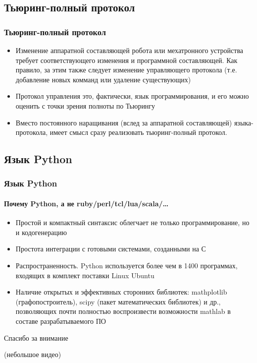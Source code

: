 \documentclass{beamer}
\begin{document}
\subsection{Тьюринг-полный протокол}
\begin{frame}
\frametitle{Тьюринг-полный протокол}
\begin{itemize}
  \item<1> Изменение аппаратной составляющей робота или мехатронного устройства
  требует соответствующего изменения и программной составляющей. Как правило, за
  этим также следует изменение управляющего протокола (т.е. добавление новых
  комманд или удаление существующих)
\item<1> Протокол управления это, фактически, язык программирования, и его можно
оценить с точки зрения полноты по Тьюрингу
\item<1> Вместо постоянного наращивания (вслед за аппаратной составляющей)
языка-протокола, имеет смысл сразу реализовать тьюринг-полный протокол.
\end{itemize}
\end{frame}

\subsection{Язык Python}
\begin{frame}
\frametitle{Язык Python}
\framesubtitle{Почему Python, а не ruby/perl/tcl/lua/scala/\ldots}
\begin{itemize}
	\item<1>Простой и компактный синтаксис облегчает не только программирование, но
	и кодогенерацию
	\item<1>Простота интеграции с готовыми системами, созданными на С
	\item<1>Распространенность. Python используется более чем в 1400
	программах, входящих в комплект поставки Linux Ubuntu
	\item<1> Наличие открытых и эффективных сторонних библиотек: mathplotlib
	(графопостроитель), scipy (пакет математических библиотек) и др.,
	позволяющих почти полностью воспроизвести возможности mathlab в составе разрабатываемого ПО
\end{itemize}
\end{frame}


\begin{frame}
\begin{center}
\begin{LARGE}
Спасибо за внимание
\end{LARGE}
(небольшое видео)
\end{center}
\end{frame}
\end{document}
